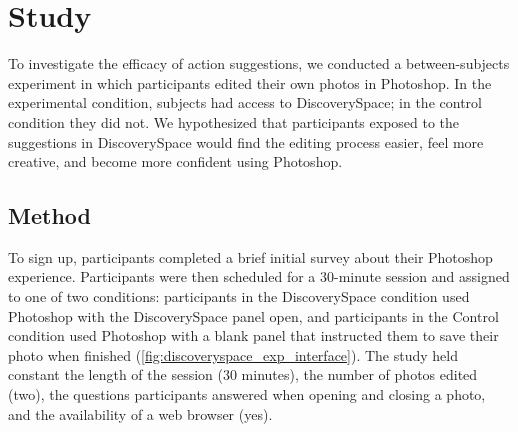 \section{Study}
To investigate the efficacy of action suggestions, we conducted a between-subjects experiment in which participants edited their own photos in Photoshop. In the experimental condition, subjects had access to Discovery\-Space; in the control condition they did not. We hypothesized that participants exposed to the suggestions in Discovery\-Space would find the editing process easier, feel more creative, and become more confident using Photoshop. 

\subsection{Method}
To sign up, participants completed a brief initial survey about their Photoshop experience. Participants were then scheduled for a 30-minute session and assigned to one of two conditions: participants in the Discovery\-Space condition used Photoshop with the Discovery\-Space panel open, and participants in the Control condition used Photoshop with a blank panel that instructed them to save their photo when finished (\autoref{fig:discoveryspace_exp_interface}). The study held constant the length of the session (30 minutes), the number of photos edited (two), the questions participants answered when opening and closing a photo, and the availability of a web browser (yes).

